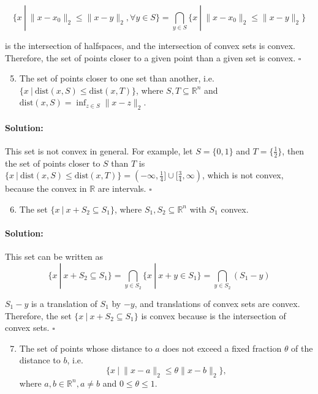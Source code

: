 \documentclass[10pt]{article}
\begin{document}
$$ \{x \ | \ \| x-x_0 \|_2 \leq \| x - y \|_2, \forall y \in S\} = \bigcap_{y \in S} \{x \ | \ \| x-x_0 \|_2 \leq \| x - y \|_2\}$$

is the intersection of halfspaces, and the intersection of convex sets is convex. Therefore, the set of points closer to a given point than a given set is convex. $\square$




\begin{enumerate}[label=(\alph*)]
  \setcounter{enumi}{4}
  \item The set of points closer to one set than another, i.e. $\{ x \ | \ \text{dist}(x, S) \leq \text{dist}(x, T)\}$, where $S, T \subseteq \mathbb{R}^n$ and $\text{dist}(x, S) = \inf_{z \in S} \| x - z \|_2$.
\end{enumerate}

\paragraph{Solution:}

This set is not convex in general. For example, let $S = \{0,1\}$ and $T = \{\frac{1}{2}\}$, then the set of points closer to $S$ than $T$ is $\{ x \ | \ \text{dist}(x, S) \leq \text{dist}(x, T)\} = (-\infty, \frac{1}{4}] \cup [\frac{3}{4}, \infty)$, which is not convex, because 
the convex in $\mathbb{R}$ are intervals. $\square$


\begin{enumerate}[label=(\alph*)]
  \setcounter{enumi}{5}
  \item The set $\{ x \ | \ x+S_2 \subseteq S_1\}$, where $S_1, S_2 \subseteq \mathbb{R}^n$ with $S_1$ convex.
\end{enumerate}

\paragraph{Solution:}

This set can be written as
 $$\{ x \ | \ x+S_2 \subseteq S_1\} = \bigcap_{y \in S_2} \{ x \ | \ x+y \in S_1\} = \bigcap_{y \in S_2} (S_1 - y)$$

 $S_1 - y$ is a translation of $S_1$ by $-y$, and translations of convex sets are convex. Therefore, the set $\{ x \ | \ x+S_2 \subseteq S_1\}$ is convex because is the intersection of convex sets. $\square$


\begin{enumerate}[label=(\alph*)]
  \setcounter{enumi}{6}
  \item The set of points whose distance to $a$ does not exceed a fixed fraction $\theta$ of the distance to $b$, i.e. $$\{x \ | \ \| x - a \|_2 \leq \theta \| x - b \|_2\},$$ where $a, b \in \mathbb{R}^n, a \neq b$ and $0 \leq \theta \leq 1$.
\end{enumerate}
\end{document}
